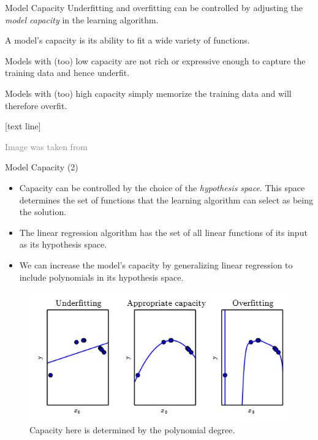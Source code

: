 \documentclass[dvipsnames]{beamer}
\newcommand{\referencefootnote}[1]{\setbeamertemplate{footline}[text line]{%
\parbox{0.9\paperwidth}{\vspace*{-23pt}\tiny{\textcolor{gray}{#1}}\hfill\scriptsize\insertframenumber}}}
\begin{document}
\begin{frame}{Model Capacity}
Underfitting and overfitting can be controlled by adjusting the \emph{model capacity} in the learning algorithm.  %

A model's capacity is its ability to fit a wide variety of functions. %

Models with (too) low capacity are not rich or expressive enough to capture the training data and hence underfit.  %

Models with (too) high capacity simply memorize the training data and will therefore overfit. 
\end{frame}
{ \referencefootnote{Image was taken from \cite{Goodfellow_et_al_2016}}
\begin{frame}{Model Capacity (2)}
\begin{itemize}
	\item Capacity can be controlled by the choice of the \emph{hypothesis space}. This space determines the set of functions that the learning algorithm can select as being the solution.  %
	\item The linear regression algorithm has the set of all linear functions of its input as its hypothesis space. %
	\item We can increase the model's capacity by generalizing linear regression to include polynomials in its hypothesis space. 
\end{itemize}
 \begin{figure}
		\center
		\includegraphics[scale=.35]{figures/capacity2.png} 
		\caption{Capacity here is determined by the polynomial degree.}
	\end{figure}
\end{frame}
}
\end{document}
